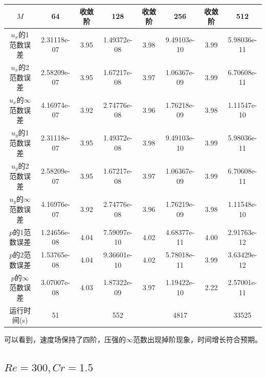 \documentclass[lang=cn,10pt,bibend=bibtex]{elegantbook}
\begin{document}
\begin{table}[H]
  \centering
  \small
  \begin{tabular}{c|ccccccc}
  \textbf{$M$}              & 64          & 收敛阶 & 128         & 收敛阶 & 256         & 收敛阶 & 512   \\ \hline
  $u_x$的1范数误差 & 2.31118e-07 & 3.95 & 1.49372e-08 & 3.98 & 9.49103e-10 & 3.99 & 5.98036e-11\\
  $u_x$的2范数误差 & 2.58209e-07 & 3.95 & 1.67217e-08 & 3.97 & 1.06367e-09 & 3.99 & 6.70608e-11\\
  $u_x$的$\infty$范数误差 & 4.16974e-07 & 3.92 & 2.74776e-08 & 3.96 & 1.76218e-09 & 3.98 & 1.11547e-10\\
  $u_y$的1范数误差 & 2.31118e-07 & 3.95 & 1.49372e-08 & 3.98 & 9.49103e-10 & 3.99 & 5.98036e-11\\
  $u_y$的2范数误差 & 2.58209e-07 & 3.95 & 1.67217e-08 & 3.97 & 1.06367e-09 & 3.99 & 6.70608e-11\\
  $u_y$的$\infty$范数误差 & 4.16976e-07 & 3.92 & 2.74776e-08 & 3.96 & 1.76219e-09 & 3.98 & 1.11548e-10\\
  $p$的1范数误差 & 1.24656e-08 & 4.04 & 7.59097e-10 & 4.02 & 4.68377e-11 & 4.00 & 2.91763e-12\\
  $p$的2范数误差 & 1.53765e-08 & 4.04 & 9.36601e-10 & 4.02 & 5.78018e-11 & 3.99 & 3.63429e-12\\
  $p$的$\infty$范数误差 & 3.07007e-08 & 4.03 & 1.87322e-09 & 3.97 & 1.19422e-10 & 2.22 & 2.57001e-11\\  
  运行时间(s)                &     51       &       &    552       &       &     4817     &       &  33525
  \end{tabular}
\end{table}

可以看到，速度场保持了四阶，压强的$\infty$范数出现掉阶现象，时间增长符合预期。

\subsection{$Re=300,Cr=1.5$}
\end{document}
